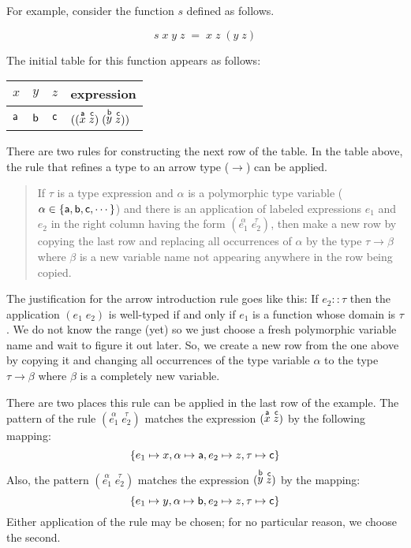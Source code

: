 \documentclass[11pt]{article}
\begin{document}
For example, consider the function $s$ defined as follows.

\[  s\; x\;y \; z\;=\; x\;z\;(y\;z) \]

The initial table for this function appears as follows:

\begin{center}
\begin{tabular}{lll|l}
$x$ & $y$ & $z$ & expression \\\hline{}
${\sf{a}}$ & ${\sf{b}}$ & ${\sf{c}}$ &$((\stackrel{{\sf{a}}}{x} \; \stackrel{{\sf{c}}}{z})\; (\stackrel{{\sf{b}}}{y} \; \stackrel{{\sf{c}}}{z}))$ \\
\end{tabular}
\end{center}

There are two rules for constructing the next row of the table.  In the table
above, the rule that refines a type to an arrow type ($\rightarrow$) can be
applied.

\begin{quotation}
 If $\tau$ is a type expression and
$\alpha$ is a polymorphic type variable ($\alpha\in\{{\sf{a}},{\sf{b}},{\sf{c}},\cdots\}$)
and there is an application of labeled expressions $e_1$ and $e_2$ in the right
column having the form $(\stackrel{\alpha}{e_1}\;\stackrel{\tau}{e_2})$, then
make a new row by copying the last row and replacing all occurrences of
$\alpha$ by the type $\tau\rightarrow{}\beta$ where $\beta$ is a new variable
name not appearing anywhere in the row being copied.
\end{quotation}

The justification for the arrow introduction rule goes like this: If
$e_2::\tau$ then the application $(e_1\;e_2)$ is well-typed if and only if
$e_1$ is a function whose domain is $\tau$.  We do not know the range (yet) so
we just choose a fresh polymorphic variable name and wait to figure it out
later.  So, we create a new row from the one above by copying it and changing
all occurrences of the type variable $\alpha$ to the type
$\tau\rightarrow{}\beta$ where $\beta$ is a completely new variable.

There are two places this rule can be applied in the last row of the
example. The pattern of the rule
$(\stackrel{\alpha}{e_1}\;\stackrel{\tau}{e_2})$ matches the expression
$(\stackrel{{\sf{a}}}{x}\;\stackrel{{\sf{c}}}{z})$ by the following mapping:
\[\{e_1\mapsto{}x, \alpha\mapsto{\sf{a}}, e_2\mapsto{}z,\tau\mapsto{\sf{c}}\}\]
Also, the pattern $(\stackrel{\alpha}{e_1}\;\stackrel{\tau}{e_2})$ matches the
expression $(\stackrel{{\sf{b}}}{y}\;\stackrel{{\sf{c}}}{z})$ by the mapping:
\[\{e_1\mapsto{}y,\alpha\mapsto{\sf{b}},e_2\mapsto{}z,  \tau\mapsto{\sf{c}}\}\]
Either application of the rule may be chosen; for no particular reason, we
choose the second.
\end{document}
